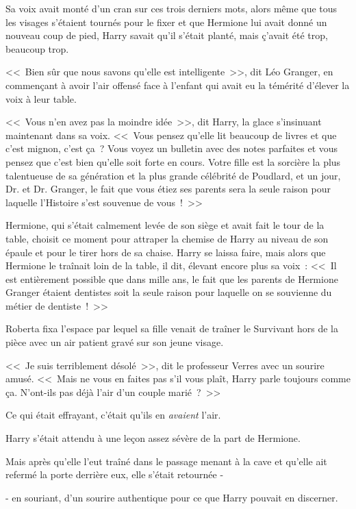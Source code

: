 Sa voix avait monté d'un cran sur ces trois derniers mots, alors même que tous les visages s'étaient tournés pour le fixer et que Hermione lui avait donné un nouveau coup de pied, Harry savait qu'il s'était planté, mais ç'avait été trop, beaucoup trop.

<<~Bien sûr que nous savons qu'elle est intelligente~>>, dit Léo Granger, en commençant à avoir l'air offensé face à l'enfant qui avait eu la témérité d'élever la voix à leur table.

<<~Vous n'en avez pas la moindre idée~>>, dit Harry, la glace s'insinuant maintenant dans sa voix. <<~Vous pensez qu'elle lit beaucoup de livres et que c'est mignon, c'est ça~? Vous voyez un bulletin avec des notes parfaites et vous pensez que c'est bien qu'elle soit forte en cours. Votre fille est la sorcière la plus talentueuse de sa génération et la plus grande célébrité de Poudlard, et un jour, Dr. et Dr. Granger, le fait que vous étiez ses parents sera la seule raison pour laquelle l'Histoire s'est souvenue de vous~!~>>

Hermione, qui s'était calmement levée de son siège et avait fait le tour de la table, choisit ce moment pour attraper la chemise de Harry au niveau de son épaule et pour le tirer hors de sa chaise. Harry se laissa faire, mais alors que Hermione le traînait loin de la table, il dit, élevant encore plus sa voix~: <<~Il est entièrement possible que dans mille ans, le fait que les parents de Hermione Granger étaient dentistes soit la seule raison pour laquelle on se souvienne du métier de dentiste~!~>>

\later

Roberta fixa l'espace par lequel sa fille venait de traîner le Survivant hors de la pièce avec un air patient gravé sur son jeune visage.

<<~Je suis terriblement désolé~>>, dit le professeur Verres avec un sourire amusé. <<~Mais ne vous en faites pas s'il vous plaît, Harry parle toujours comme ça. N'ont-ils pas déjà l'air d'un couple marié~?~>>

Ce qui était effrayant, c'était qu'ils en \emph{avaient} l'air.

\later

Harry s'était attendu à une leçon assez sévère de la part de Hermione.

Mais après qu'elle l'eut traîné dans le passage menant à la cave et qu'elle ait refermé la porte derrière eux, elle s'était retournée -

- en souriant, d'un sourire authentique pour ce que Harry pouvait en discerner.

